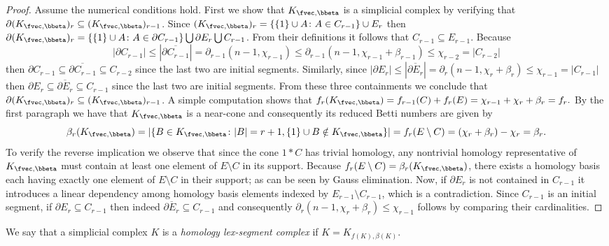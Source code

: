 \begin{proof}
Assume the numerical conditions hold.
  First we show that $K_{\fvec,\bbeta}$ is a simplicial complex by verifying that $\partial (K_{\fvec,\bbeta})_r \subseteq (K_{\fvec,\bbeta})_{r-1}$.
  Since $(K_{\fvec,\bbeta})_r = \{ \{1\} \cup A \colon A\in C_{r-1}\}\cup E_r$ then
  $\partial (K_{\fvec,\bbeta})_r = \{\{1\} \cup A \colon A\in \partial C_{r-1}\} \bigcup \partial E_r \bigcup C_{r-1}$.
  From their definitions it follows that $C_{r-1}\subseteq E_{r-1}$. 
  Because $$|\partial C_{r-1}|\leq |\overline{\partial C_{r-1}}| = \partial_{r-1}(n-1,\chi_{r-1}) \leq \partial_{r-1}(n-1,\chi_{r-1}+\beta_{r-1})\leq \chi_{r-2} = |C_{r-2}|$$ 
  then $\partial C_{r-1}\subseteq \overline{\partial C_{r-1}}\subseteq C_{r-2}$ since the last two are initial segments.
  Similarly, since $|\partial E_r|\leq |\overline{\partial E_r}|=\partial_r(n-1,\chi_r+\beta_r) \leq \chi_{r-1}= |C_{r-1}|$ 
  then $\partial E_r \subseteq \overline{\partial E_r}\subseteq C_{r-1}$ since the last two are initial segments. From these three containments we conclude that $\partial (K_{\fvec,\bbeta})_r \subseteq (K_{\fvec,\bbeta})_{r-1}$.
%
    A simple computation shows that $f_r(K_{\fvec,\bbeta})=f_{r-1}(C)+f_r(E)=\chi_{r-1}+\chi_r+\beta_r=f_r.$    
    By the first paragraph we have that $K_{\fvec,\bbeta}$ is a near-cone and consequently its reduced Betti numbers are given by~\cite[Theorem 4.3]{Bjorner-Kalai-ACTA}
    \[
    \beta_r(K_{\fvec,\bbeta}) =|\{B\in K_{\fvec,\bbeta}\colon |B|=r+1, \{1\} \cup B \notin K_{\fvec,\bbeta}\}| = 
    f_r(E\setminus C) = 
    (\chi_r+\beta_r)-\chi_r=\beta_r.
    \]
%
    To verify the reverse implication we observe that since the cone $1*C$ has trivial homology, any nontrivial homology representative of $K_{\fvec,\bbeta}$ must contain at least one element of $E\setminus C$ in its support.
    Because $f_r(E\setminus C)=\beta_r(K_{\fvec,\bbeta})$, there exists a homology basis each having exactly one element of $E\setminus C$ in their support; as can be seen by Gauss elimination.
    Now, if $\partial E_r$ is not contained in $C_{r-1}$ it introduces a linear dependency among homology basis elements indexed by $E_{r-1}\setminus C_{r-1}$, which is a contradiction. Since $C_{r-1}$ is an initial segment, if $\partial E_r \subseteq C_{r-1}$ then indeed $\overline{\partial E_r} \subseteq C_{r-1}$ and consequently $\partial_r(n-1,\chi_r+\beta_r)\leq \chi_{r-1}$ follows by comparing their cardinalities.
\end{proof}
We say that a simplicial complex $K$ is a \emph{homology lex-segment complex} if $K=K_{f(K),\beta(K)}$.
